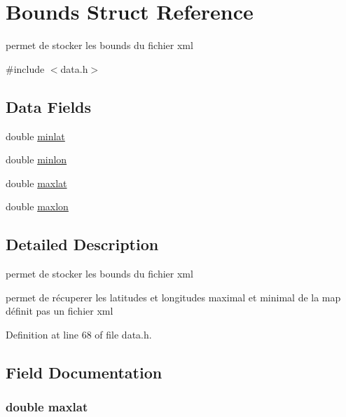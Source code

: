 \hypertarget{struct_bounds}{}\section{Bounds Struct Reference}
\label{struct_bounds}


permet de stocker les bounds du fichier xml  




{\ttfamily \#include $<$data.\+h$>$}

\subsection*{Data Fields}
\begin{DoxyCompactItemize}
\item 
double \hyperlink{struct_bounds_ae6882148ee59d0266307fd7a39b8945c}{minlat}
\item 
double \hyperlink{struct_bounds_a59ff75088f2d17feafb6a6cb7b52cc0c}{minlon}
\item 
double \hyperlink{struct_bounds_a037868ceabb80ff01a9a3e9d05ae4abd}{maxlat}
\item 
double \hyperlink{struct_bounds_a2ac2c59e3c0eb6ec8661c8ff1ea04b83}{maxlon}
\end{DoxyCompactItemize}


\subsection{Detailed Description}
permet de stocker les bounds du fichier xml 

permet de récuperer les latitudes et longitudes maximal et minimal de la map définit pas un fichier xml 

Definition at line 68 of file data.\+h.



\subsection{Field Documentation}
\subsubsection[{\texorpdfstring{maxlat}{maxlat}}]{\setlength{\rightskip}{0pt plus 5cm}double maxlat}\hypertarget{struct_bounds_a037868ceabb80ff01a9a3e9d05ae4abd}{}\label{struct_bounds_a037868ceabb80ff01a9a3e9d05ae4abd}


